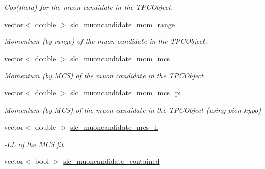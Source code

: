 \begin{DoxyCompactItemize}
\begin{DoxyCompactList}\small\item\em Cos(theta) for the muon candidate in the T\-P\-C\-Object. \end{DoxyCompactList}\item 
\hypertarget{classUBXSecEvent_a80cdc2f0c0eaac347f9475e1e04ca68b}{vector$<$ double $>$ \hyperlink{classUBXSecEvent_a80cdc2f0c0eaac347f9475e1e04ca68b}{slc\-\_\-muoncandidate\-\_\-mom\-\_\-range}}\label{classUBXSecEvent_a80cdc2f0c0eaac347f9475e1e04ca68b}

\begin{DoxyCompactList}\small\item\em Momentum (by range) of the muon candidate in the T\-P\-C\-Object. \end{DoxyCompactList}\item 
\hypertarget{classUBXSecEvent_abfd994bade285f9f67f74f1a210f5422}{vector$<$ double $>$ \hyperlink{classUBXSecEvent_abfd994bade285f9f67f74f1a210f5422}{slc\-\_\-muoncandidate\-\_\-mom\-\_\-mcs}}\label{classUBXSecEvent_abfd994bade285f9f67f74f1a210f5422}

\begin{DoxyCompactList}\small\item\em Momentum (by M\-C\-S) of the muon candidate in the T\-P\-C\-Object. \end{DoxyCompactList}\item 
\hypertarget{classUBXSecEvent_a28a09d3ac5399de319c2fb2d31ea0652}{vector$<$ double $>$ \hyperlink{classUBXSecEvent_a28a09d3ac5399de319c2fb2d31ea0652}{slc\-\_\-muoncandidate\-\_\-mom\-\_\-mcs\-\_\-pi}}\label{classUBXSecEvent_a28a09d3ac5399de319c2fb2d31ea0652}

\begin{DoxyCompactList}\small\item\em Momentum (by M\-C\-S) of the muon candidate in the T\-P\-C\-Object (using pion hypo) \end{DoxyCompactList}\item 
\hypertarget{classUBXSecEvent_a7342f551004e2275665345afe33d21a2}{vector$<$ double $>$ \hyperlink{classUBXSecEvent_a7342f551004e2275665345afe33d21a2}{slc\-\_\-muoncandidate\-\_\-mcs\-\_\-ll}}\label{classUBXSecEvent_a7342f551004e2275665345afe33d21a2}

\begin{DoxyCompactList}\small\item\em -\/\-L\-L of the M\-C\-S fit \end{DoxyCompactList}\item 
\hypertarget{classUBXSecEvent_acece0aff774df48cee7bd4146870c559}{vector$<$ bool $>$ \hyperlink{classUBXSecEvent_acece0aff774df48cee7bd4146870c559}{slc\-\_\-muoncandidate\-\_\-contained}}\label{classUBXSecEvent_acece0aff774df48cee7bd4146870c559}


\end{DoxyCompactItemize}
